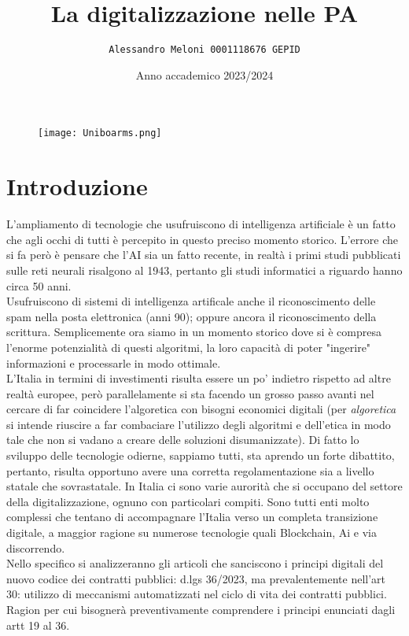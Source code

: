 \documentclass{article}
\title{\huge\textbf{La digitalizzazione nelle PA}}
\author{\texttt{Alessandro Meloni 0001118676 GEPID}}
\date{Anno accademico 2023/2024}
\begin{document}
\begin{figure}
    \centering
    \texttt{[image: Uniboarms.png]}
\end{figure}
\maketitle

\centering \tableofcontents

\newpage\centering
\section{Introduzione}
\begin{justify}
L'ampliamento di tecnologie che usufruiscono di intelligenza artificiale è un fatto che agli occhi di tutti è percepito in questo preciso momento storico. L'errore che si fa però è pensare che l'AI sia un fatto recente, in realtà i primi studi pubblicati sulle reti neurali risalgono al 1943, pertanto gli studi informatici a riguardo hanno circa 50 anni.\citep{mcculloch1943logical}\\ Usufruiscono di sistemi di intelligenza artificale anche il riconoscimento delle spam nella posta elettronica (anni 90); oppure ancora il riconoscimento della scrittura. Semplicemente ora siamo in un momento storico dove si è compresa l'enorme potenzialità di questi algoritmi, la loro capacità di poter "ingerire" informazioni e processarle in modo ottimale.\\
L'Italia in termini di investimenti risulta essere un po' indietro rispetto ad altre realtà europee, però parallelamente si sta facendo un grosso passo avanti nel cercare di far coincidere l'algoretica con bisogni economici digitali (per \textit{algoretica} si intende riuscire a far combaciare l'utilizzo degli algoritmi e dell'etica in modo tale che non si vadano a creare delle soluzioni disumanizzate).
Di fatto lo sviluppo delle tecnologie odierne, sappiamo tutti, sta aprendo un forte dibattito, pertanto, risulta opportuno avere una corretta regolamentazione sia a livello statale che sovrastatale.
In Italia ci sono varie aurorità che si occupano del settore della digitalizzazione, ognuno con particolari compiti.
Sono tutti enti molto complessi che tentano di accompagnare l'Italia verso un completa transizione digitale, a maggior ragione su numerose tecnologie quali Blockchain, Ai e via discorrendo.\\
Nello specifico si analizzeranno gli articoli che sanciscono i principi digitali del nuovo codice dei contratti pubblici: d.lgs 36/2023, ma prevalentemente nell'art 30: utilizzo di meccanismi automatizzati nel ciclo di vita dei contratti pubblici. Ragion per cui bisognerà preventivamente comprendere i principi enunciati dagli artt 19 al 36.\\

\end{justify}
\end{document}
